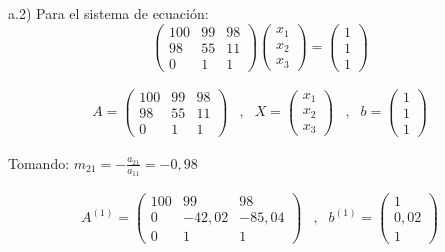 a.2) Para el sistema de ecuación:\\
\begin{equation*}
    \begin{pmatrix}
        100 & 99 & 98 \\
        98 & 55 & 11 \\
        0 & 1 & 1
    \end{pmatrix}
    \begin{pmatrix}
        x_1 \\
        x_2 \\
        x_3
    \end{pmatrix}    
    =    
    \begin{pmatrix}
        1 \\
        1 \\
        1
    \end{pmatrix}
\end{equation*}

\begin{equation*}
    \begin{matrix}
        A=\begin{pmatrix}
            100 & 99 & 98 \\
            98 & 55 & 11 \\
            0 & 1 & 1
        \end{pmatrix}
        & , &
        X=\begin{pmatrix}
            x_1 \\
            x_2 \\
            x_3
        \end{pmatrix} 
        & , &
        b=\begin{pmatrix}
            1 \\
            1 \\
            1
        \end{pmatrix}
    \end{matrix}
\end{equation*}

Tomando: $m_{21}=-\frac{a_{21}}{a_{11}}=-0,98$

\begin{equation*}
    \begin{matrix}
        A^{(1)}= \begin{pmatrix}
            100 & 99 & 98 \\
            0 & -42,02 & -85,04 \\
            0 & 1 & 1
        \end{pmatrix}
        & , &
        b^{(1)}=\begin{pmatrix}
            1 \\
            0,02 \\
            1
        \end{pmatrix}
    \end{matrix}
\end{equation*}

